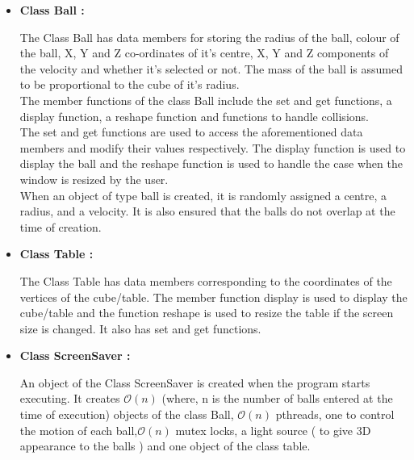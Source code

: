\documentclass[]{article}
\begin{document}
\begin{itemize}

\item \textbf{Class Ball :}

\begin{flushleft}

The Class Ball has data members for storing the radius of the ball, colour of the ball, X, Y and Z co-ordinates of it's centre, X, Y and Z components of the velocity and whether it's selected or not. The mass of the ball is assumed to be proportional to the cube of it's radius. 
\\
The member functions of the class Ball include the set and get functions, a display function, a reshape function and functions to handle collisions.\\ The set and get functions are used to access the aforementioned data members and modify their values respectively. The display function is used to display the ball and the reshape function is used to handle the case when the window is resized by the user.\\
When an object of type ball is created, it is randomly assigned a centre, a radius, and a velocity. It is also ensured that the balls do not overlap at the time of creation.
\end{flushleft}

\item \textbf{Class Table :}

\begin{flushleft}

The Class Table has data members corresponding to the coordinates of the vertices of the cube/table. The member function display is used to display the cube/table and the function reshape is used to resize the table if the screen size is changed. It also has set and get functions.
\end{flushleft}


\item \textbf{Class ScreenSaver :}

\begin{flushleft}

An object of the Class ScreenSaver is created when the program starts executing. It creates $\mathcal{O}(n)$ (where, n is the number of balls entered at the time of execution) objects of the class Ball, $\mathcal{O}(n)$ pthreads, one to control the motion of each ball,$\mathcal{O}(n)$ mutex locks, a light source ( to give 3D appearance to the balls ) and one object of the class table. \\
\medskip


\end{flushleft}
\end{itemize}
\end{document}
